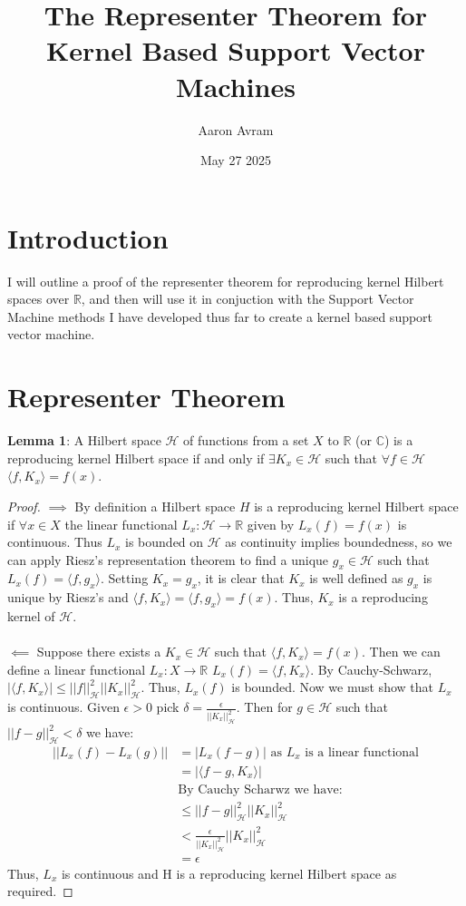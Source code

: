 \documentclass[12pt]{article}
\title{The Representer Theorem for Kernel Based Support Vector Machines}
\author{Aaron Avram}
\date{May 27 2025}
\begin{document}
\maketitle

\section*{Introduction}
I will outline a proof of the representer theorem for reproducing kernel Hilbert spaces over $\mathbb{R}$, and then will use it in conjuction
with the Support Vector Machine methods I have developed thus far to create a kernel based support vector machine.

\section* {Representer Theorem}
\textbf{Lemma 1}: A Hilbert space $\mathcal{H}$ of functions from a set $X$ to $\mathbb{R}$ (or $\mathbb{C}$) is a reproducing kernel Hilbert space 
if and only if $\exists K_x \in \mathcal{H}$ such that $\forall f \in \mathcal{H}$ $\langle f, K_x \rangle = f(x)$.
\begin{proof}
$\implies$ By definition a Hilbert space $H$ is a reproducing kernel Hilbert space if $\forall x \in X$ the linear functional $L_x: \mathcal{H} \to \mathbb{R}$
given by $L_x(f) = f(x)$ is continuous. Thus $L_x$ is bounded on $\mathcal{H}$ as continuity implies boundedness, so we can apply Riesz's representation theorem to find a unique $g_x \in \mathcal{H}$
such that $L_x(f) = \langle f, g_x \rangle$. Setting $K_x = g_x$, it is clear that $K_x$ is well defined as $g_x$ is unique by Riesz's and 
$\langle f, K_x \rangle = \langle f, g_x \rangle = f(x)$. Thus, $K_x$ is a reproducing kernel of $\mathcal{H}$.
\\ \\
$\impliedby$ Suppose there exists a $K_x \in \mathcal{H}$ such that $\langle f, K_x \rangle = f(x)$. Then we can define a linear functional $L_x: X \to \mathbb{R}$
$L_x(f) = \langle f, K_x \rangle$. By Cauchy-Schwarz, $|\langle f, K_x \rangle| \leq ||f||_\mathcal{H}^2||K_x||_\mathcal{H}^2$. Thus, $L_x(f)$ is bounded. Now we must
show that $L_x$ is continuous. Given $\epsilon > 0$ pick $\delta = \frac{\epsilon}{||K_x||^2_\mathcal{H}}$. Then for $g \in \mathcal{H}$ such that $||f - g||_\mathcal{H}^2 < \delta$
we have:
\begin{align*}
    ||L_x(f) - L_x(g)|| &= |L_x(f - g)| \text{ as $L_x$ is a linear functional}\\
    &= |\langle f - g, K_x \rangle| \\
    &\text{By Cauchy Scharwz we have:} \\
    &\leq ||f - g||_\mathcal{H}^2 ||K_x||_\mathcal{H}^2 \\
    &< \frac{\epsilon}{||K_x||^2_\mathcal{H}}||K_x||_\mathcal{H}^2 \\
    &= \epsilon
\end{align*}
Thus, $L_x$ is continuous and H is a reproducing kernel Hilbert space as required.
\end{proof}
\end{document}
